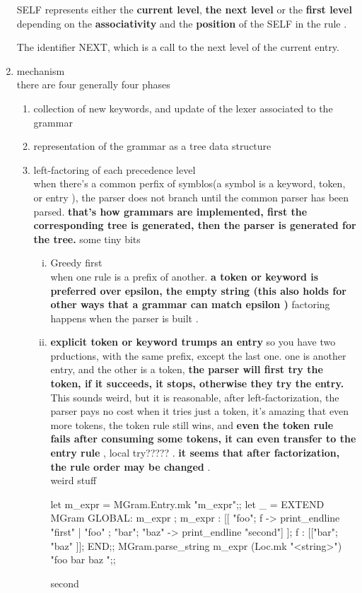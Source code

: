 \begin{enumerate}
  SELF represents either the \textbf{current level}, \textbf{the next level} or
  the \textbf{ first level} depending on the \textbf{ associativity} and the
  \textbf{position}  of the SELF in the rule .

  The identifier NEXT, which is a call to the next level of the
  current entry.


\item mechanism \\
  there are four generally four phases
  \begin{enumerate}[1]
  \item collection of new keywords, and update of the lexer associated
    to the grammar
  \item representation of the grammar as a tree data structure
  \item left-factoring of each precedence level \\
    when there's a common perfix of symblos(a symbol is a keyword,
    token, or entry ), the parser does not branch until the common parser
    has been parsed. \textbf{that's how grammars are implemented, first the
      corresponding tree is generated, then the parser is generated for
      the tree.}
    some tiny bits 
    \begin{enumerate}[(i)]
    \item Greedy first \\
      when one rule is a prefix of another. 
      \textbf{a token or keyword is preferred over
    epsilon, the empty string (this also holds for other ways that a
    grammar can match epsilon )} factoring happens when the parser is
  built .
    \item \textbf{ explicit token or keyword trumps an entry}
      so you have two prductions, with the same prefix, except the last
      one. one is another entry, and the other is a token, \textbf{the parser will
  first try the token, if it succeeds, it stops, otherwise they try
  the entry.} This sounds weird, but it is reasonable, after
left-factorization, the parser pays no cost when it tries just a
token, it's amazing that even more tokens, the token rule still wins,
and \textbf{even the token rule fails after consuming some tokens, it can
  even transfer to the entry rule }, local try????? .
  \textbf{it seems that after factorization, the rule order may be
    changed }. \\

weird stuff 
\begin{redcode}
let m_expr = MGram.Entry.mk "m_expr";;
let _ =
EXTEND MGram  GLOBAL: m_expr ;
    m_expr : 
     [[ "foo"; f  -> print_endline "first"
      | "foo" ; "bar"; "baz" -> print_endline "second"]
     ]; 
    f : [["bar"; "baz" ]];  END;;
MGram.parse_string m_expr (Loc.mk "<string>") "foo bar baz ";;
\end{redcode}
\begin{bluecode}
second
\end{bluecode}  


\end{enumerate}
\end{enumerate}
\end{enumerate}
